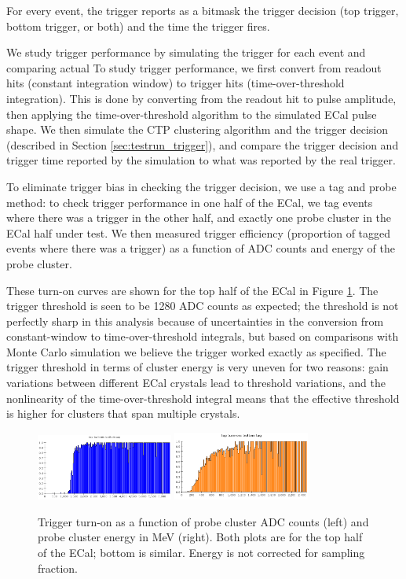 For every event, the trigger reports as a bitmask the trigger decision (top trigger, bottom trigger, or both) and the time the trigger fires.

We study trigger performance by simulating the trigger for each event and comparing actual To study trigger performance, we first convert from readout hits (constant integration window) to trigger hits (time-over-threshold integration). 
This is done by converting from the readout hit to pulse amplitude, then applying the time-over-threshold algorithm to the simulated ECal pulse shape. 
We then simulate the CTP clustering algorithm and the trigger decision (described in Section \ref{sec:testrun_trigger}), and compare the trigger decision and trigger time reported by the simulation to what was reported by the real trigger.

To eliminate trigger bias in checking the trigger decision, we use a tag and probe method: to check trigger performance in one half of the ECal, we tag events where there was a trigger in the other half, and exactly one probe cluster in the ECal half under test. 
We then measured trigger efficiency (proportion of tagged events where there was a trigger) as a function of ADC counts and energy of the probe cluster.

These turn-on curves are shown for the top half of the ECal in Figure \ref{fig:turnon}. 
The trigger threshold is seen to be 1280 ADC counts as expected; the threshold is not perfectly sharp in this analysis because of uncertainties in the conversion from constant-window to time-over-threshold integrals, but based on comparisons with Monte Carlo simulation we believe the trigger worked exactly as specified. 
The trigger threshold in terms of cluster energy is very uneven for two reasons: gain variations between different ECal crystals lead to threshold variations, and the nonlinearity of the time-over-threshold integral means that the effective threshold is higher for clusters that span multiple crystals.

\begin{figure}[ht]
	\includegraphics[width=0.4\textwidth]{test2012/ecalperformance/top_turnon_adc}
	\includegraphics[width=0.4\textwidth]{test2012/ecalperformance/top_turnon_e}
	\caption{\small{Trigger turn-on as a function of probe cluster ADC counts (left) and probe cluster energy in MeV (right). Both plots are for the top half of the ECal; bottom is similar. 
	Energy is not corrected for sampling fraction.}}
	\label{fig:turnon}
\end{figure}

